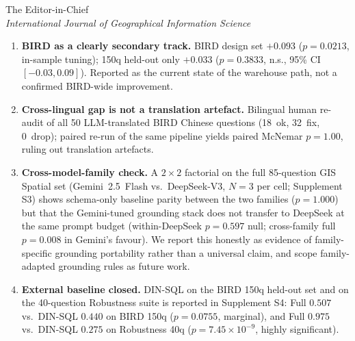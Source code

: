 \documentclass[11pt]{letter}
\begin{document}
\begin{letter}{The Editor-in-Chief \\ \emph{International Journal of Geographical Information Science}}
\begin{enumerate}[leftmargin=*]
\item \textbf{BIRD as a clearly secondary track.} BIRD design set $+0.093$ ($p=0.0213$, in-sample tuning); 150q held-out only $+0.033$ ($p=0.3833$, n.s., 95\% CI $[-0.03, 0.09]$). Reported as the current state of the warehouse path, not a confirmed BIRD-wide improvement.

\item \textbf{Cross-lingual gap is not a translation artefact.} Bilingual human re-audit of all 50 LLM-translated BIRD Chinese questions (18~ok, 32~fix, 0~drop); paired re-run of the same pipeline yields paired McNemar $p=1.00$, ruling out translation artefacts.

\item \textbf{Cross-model-family check.} A $2{\times}2$ factorial on the full 85-question GIS Spatial set (Gemini~2.5~Flash vs.\ DeepSeek-V3, $N{=}3$ per cell; Supplement S3) shows schema-only baseline parity between the two families ($p=1.000$) but that the Gemini-tuned grounding stack does not transfer to DeepSeek at the same prompt budget (within-DeepSeek $p=0.597$ null; cross-family full $p=0.008$ in Gemini's favour). We report this honestly as evidence of family-specific grounding portability rather than a universal claim, and scope family-adapted grounding rules as future work.

\item \textbf{External baseline closed.} DIN-SQL on the BIRD 150q held-out set and on the 40-question Robustness suite is reported in Supplement S4: Full $0.507$ vs.\ DIN-SQL $0.440$ on BIRD 150q ($p=0.0755$, marginal), and Full $0.975$ vs.\ DIN-SQL $0.275$ on Robustness 40q ($p=7.45\times10^{-9}$, highly significant).
\end{enumerate}


\end{letter}
\end{document}
